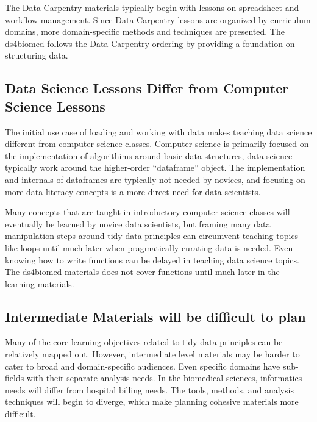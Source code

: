 \documentclass[030-workshop.tex]{subfiles}
\begin{document}
            The Data Carpentry materials typically begin with lessons on spreadsheet and workflow management.
            Since Data Carpentry lessons are organized by curriculum domains,
            more domain-specific methods and techniques are presented.
            The ds4biomed follows the Data Carpentry ordering by providing a foundation on structuring data.

    \subsection{Data Science Lessons Differ from Computer Science Lessons}

        The initial use case of loading and working with data makes teaching data science different from computer science classes.
        Computer science is primarily focused on the implementation of algorithims around basic data structures,
        data science typically work around the higher-order ``dataframe'' object.
        The implementation and internals of dataframes are typically not needed by novices,
        and focusing on more data literacy concepts is a more direct need for data scientists.

        Many concepts that are taught in introductory computer science classes will eventually be learned by novice data scientists,
        but framing many data manipulation steps around tidy data principles can circumvent
        teaching topics like loops until much later when pragmatically curating data is needed.
        Even knowing how to write functions can be delayed in teaching data science topics.
        The ds4biomed materials does not cover functions until much later in the learning materials.

    \subsection{Intermediate Materials will be difficult to plan}

        Many of the core learning objectives related to tidy data principles can be relatively mapped out.
        However, intermediate level materials may be harder to cater to broad and domain-specific audiences.
        Even specific domains have sub-fields with their separate analysis needs.
        In the biomedical sciences, informatics needs will differ from hospital billing needs.
        The tools, methods, and analysis techniques will begin to diverge, which make planning
        cohesive materials more difficult.
\end{document}
